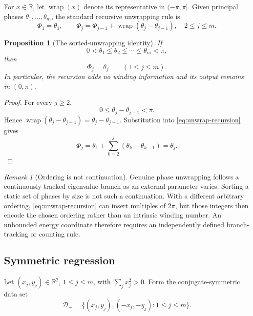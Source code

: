 \documentclass[11pt]{article}
\newtheorem{proposition}[theorem]{Proposition}
\theoremstyle{definition}
\theoremstyle{remark}
\newtheorem{remark}[theorem]{Remark}
\newcommand{\R}{\mathbb R}
\newcommand{\wrap}{\operatorname{wrap}}
\begin{document}
For $x\in\R$, let $\wrap(x)$ denote its representative in $(-\pi,\pi]$.  Given principal phases $\theta_1,\ldots,\theta_m$, the standard recursive unwrapping rule is
\begin{equation}\label{eq:unwrap-recursion}
    \Phi_1=\theta_1,
    \qquad
    \Phi_j=\Phi_{j-1}+\wrap(\theta_j-\theta_{j-1}),
    \quad 2\le j\le m.
\end{equation}

\begin{proposition}[The sorted-unwrapping identity]\label{prop:unwrap}
If
\[
    0<\theta_1\le\theta_2\le\cdots\le\theta_m<\pi,
\]
then
\begin{equation}\label{eq:unwrap-identity}
    \Phi_j=\theta_j
    \qquad (1\le j\le m).
\end{equation}
In particular, the recursion adds no winding information and its output remains in $(0,\pi)$.
\end{proposition}

\begin{proof}
For every $j\ge2$,
\[
    0\le\theta_j-\theta_{j-1}<\pi.
\]
Hence $\wrap(\theta_j-\theta_{j-1})=\theta_j-\theta_{j-1}$.  Substitution into \eqref{eq:unwrap-recursion} gives
\[
    \Phi_j
    =\theta_1+\sum_{k=2}^j(\theta_k-\theta_{k-1})
    =\theta_j.
\]
\end{proof}

\begin{remark}[Ordering is not continuation]\label{rem:ordering}
Genuine phase unwrapping follows a continuously tracked eigenvalue branch as an external parameter varies.  Sorting a static set of phases by size is not such a continuation.  With a different arbitrary ordering, \eqref{eq:unwrap-recursion} can insert multiples of $2\pi$, but those integers then encode the chosen ordering rather than an intrinsic winding number.  An unbounded energy coordinate therefore requires an independently defined branch-tracking or counting rule.
\end{remark}

\subsection{Symmetric regression}

Let $(x_j,y_j)\in\R^2$, $1\le j\le m$, with $\sum_jx_j^2>0$.  Form the conjugate-symmetric data set
\begin{equation}\label{eq:symmetric-data}
    \mathcal D_\pm
    =\{(x_j,y_j),(-x_j,-y_j):1\le j\le m\}.
\end{equation}
\end{document}
